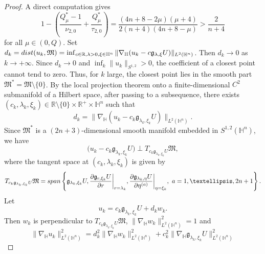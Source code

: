 \documentclass[10pt,a4paper]{amsart}
\begin{document}
\begin{proof}
{A direct computation gives}
\begin{equation*}
 1-\left(\frac{Q^{\ast}_{\mu}-1}{\nu_{2,0}}+\frac{Q^{\ast}_{\mu}}{\tau_{2,0}}\right)=\frac{(4n+8-2\mu)(\mu+4)}{2(n+4)(4n+8-\mu)}>\frac{2}{n+4}
\end{equation*}
for all $\mu\in (0,Q)$.
{Set $d_k={\rm dist}(u_k,\mathfrak{M})=\inf_{c\in \mathbb{R},\lambda>0,\xi\in \mathbb{H}^n}\|\nabla_\mathbb{H}(u_k-c\mathfrak{g}_{\lambda,\xi}U)\|_{L^{2}(\mathbb{H}^{n})}$. Then $d_k\to0$ as $k\to+\infty$.}
Since $d_k\to0$ and $\inf_k\|u_k\|_{S^{1,2}}>0$, the coefficient of a closest point cannot tend to zero. Thus, for $k$ large, the closest point lies in the smooth part $\mathfrak{M}^*=\mathfrak{M}\setminus \{0\}$. By the local projection theorem onto a finite-dimensional $C^2$ submanifold of a Hilbert space, after passing to a subsequence, there exists $(c_k,\lambda_k,\xi_k)\in \mathbb{R}\setminus \{0\}\times\mathbb{R}^+\times\mathbb{H}^n$ such that
\begin{equation*}
 d_k=\big\|\nabla_\mathbb{H}(u_k-c_k\mathfrak{g}_{\lambda_k,\xi_k}U)\big\|_{{L}^{2}(\mathbb{H}^n)}.
\end{equation*}
{Since $\mathfrak M^*$ is a $(2n+3)$-dimensional smooth manifold embedded in $S^{1,2}(\mathbb H^n)$,}
we have
 \begin{equation*}
 \big(u_k-c_k\mathfrak{g}_{\lambda_k,\xi_k}U\big)\perp T_{c_k\mathfrak{g}_{\lambda_k,\xi_k}U}\mathfrak{M},
 \end{equation*}
 where the tangent space at $(c_k,\lambda_k,\xi_k)$ is given by
 \begin{equation*}
 T_{c_k\mathfrak{g}_{\lambda_k,\xi_k}U}\mathfrak{M}={\rm span}\left\{\mathfrak{g}_{\lambda_k,\xi_k}U, \frac{\partial \mathfrak{g}_{r,\xi_k}U}{\partial r}\bigg|_{r=\lambda_k},\frac{\partial \mathfrak{g}_{\lambda_k,\eta}U}{\partial \eta^{(a)}}\bigg|_{\eta=\xi_k},~a=1,\ldots,2n+1
 \right\}.
 \end{equation*}
 Let
 \begin{equation*}
 u_k=c_k\mathfrak{g}_{\lambda_k,\xi_k}U+d_k w_k.
 \end{equation*}
 {Then $w_k$ is perpendicular to $T_{c_k\mathfrak{g}_{\lambda_k,\xi_k}U}\mathfrak{M}$,} $\|\nabla_\mathbb{H}w_k\|^2_{L^{2}(\mathbb{H}^n)}=1$ and
 \begin{equation*}
 \|\nabla_\mathbb{H}u_k\|^2_{L^{2}(\mathbb{H}^n)}=d_k^2\|\nabla_\mathbb{H}w_k\|
 _{L^{2}(\mathbb{H}^n)}^2+c_k^2\|\nabla_\mathbb{H}\mathfrak{g}_{\lambda_k,\xi_k}U\|^2_
 {L^{2}(\mathbb{H}^n)}

\end{equation*}
\end{proof}
\end{document}
